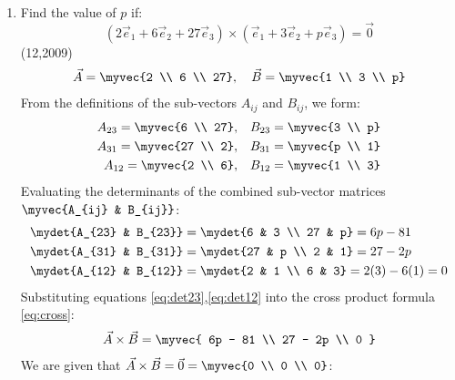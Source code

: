 \begin{enumerate}[label=\thesubsection.\arabic*, ref=\thesubsection.\theenumi]
    \item Find the value of $p$ if: $$(2\vec{e}_1 + 6\vec{e}_2 + 27\vec{e}_3) \times (\vec{e}_1 + 3\vec{e}_2 + p\vec{e}_3) = \vec{0}$$ \hfill{(12,2009)} \\
    \solution
  \begin{align}
  	\vec{A} = \myvec{2 \\ 6 \\ 27}, \quad \vec{B} = \myvec{1 \\ 3 \\ p}
  \end{align}
  From the definitions of the sub-vectors $A_{ij}$ and $B_{ij}$, we form:
  \begin{align}
  	A_{23} = \myvec{6 \\ 27}, &\quad B_{23} = \myvec{3 \\ p} \\
  	A_{31} = \myvec{27 \\ 2}, &\quad B_{31} = \myvec{p \\ 1} \\
  	A_{12} = \myvec{2 \\ 6}, &\quad B_{12} = \myvec{1 \\ 3}
  \end{align}
  Evaluating the determinants of the combined sub-vector matrices $\myvec{A_{ij} & B_{ij}}$:
  \begin{align}
  	\mydet{A_{23} & B_{23}} &= \mydet{6 & 3 \\ 27 & p} = 6p - 81
  	\label{eq:det23} \\
  	\mydet{A_{31} & B_{31}} &= \mydet{27 & p \\ 2 & 1} = 27 - 2p
  	\label{eq:det31} \\
  	\mydet{A_{12} & B_{12}} &= \mydet{2 & 1 \\ 6 & 3} = 2(3) - 6(1) = 0
  	\label{eq:det12}
  \end{align}
  Substituting equations \eqref{eq:det23},\eqref{eq:det12} into the cross product formula \eqref{eq:cross}:
  \begin{align}
  	\vec{A} \times \vec{B} = \myvec{
  		6p - 81 \\
  		27 - 2p \\
  		0
  	}
  \end{align}
  We are given that $\vec{A} \times \vec{B} = \vec{0} = \myvec{0 \\ 0 \\ 0}$:
  \begin{align}

\end{align}
\end{enumerate}
